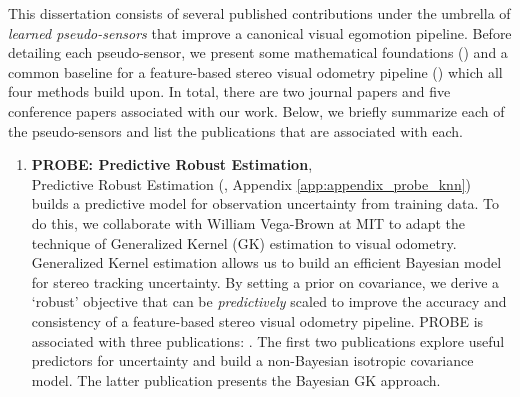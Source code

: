 This dissertation consists of several published contributions under the umbrella of \textit{learned pseudo-sensors} that improve a canonical visual egomotion pipeline. Before detailing each pseudo-sensor, we present some mathematical foundations () and a common baseline for a feature-based stereo visual odometry pipeline () which all four methods build upon. In total, there are two journal papers and five conference papers associated with our work. Below, we briefly summarize each of the pseudo-sensors and list the publications that are associated with each.
\begin{enumerate}
\item \textbf{PROBE: Predictive Robust Estimation},  \\
Predictive Robust Estimation (, Appendix \ref{app:appendix_probe_knn}) builds a predictive model for observation uncertainty from training data. To do this, we collaborate with William Vega-Brown at MIT to adapt the technique of Generalized Kernel (GK) estimation \citep{Vega-Brown2014-sb} to visual odometry. Generalized Kernel estimation allows us to build an efficient Bayesian model for stereo tracking uncertainty. By setting a prior on covariance, we derive a `robust' objective that can be \textit{predictively} scaled to improve the accuracy and consistency of a feature-based stereo visual odometry pipeline. PROBE is associated with three publications: \cite{2015_Peretroukhin_PROBE,2015_Peretroukhin_Get,Peretroukhin2016-om}. The first two publications explore useful predictors for uncertainty and build a non-Bayesian isotropic covariance model. The latter publication presents the Bayesian GK approach.


\end{enumerate}
